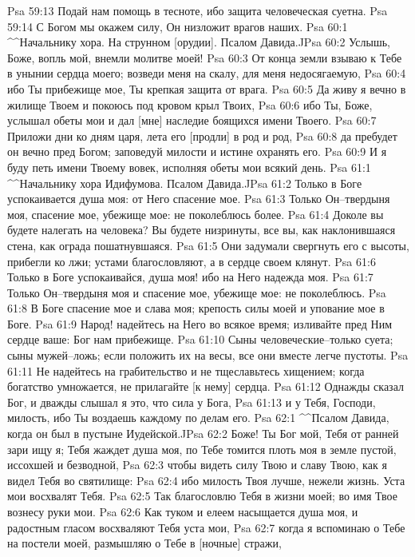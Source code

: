 Psa 59:13  Подай нам помощь в тесноте, ибо защита человеческая суетна.
Psa 59:14  С Богом мы окажем силу, Он низложит врагов наших.
Psa 60:1  ^^Начальнику хора. На струнном [орудии]. Псалом Давида.^^
Psa 60:2  Услышь, Боже, вопль мой, внемли молитве моей!
Psa 60:3  От конца земли взываю к Тебе в унынии сердца моего; возведи меня на скалу, для меня недосягаемую,
Psa 60:4  ибо Ты прибежище мое, Ты крепкая защита от врага.
Psa 60:5  Да живу я вечно в жилище Твоем и покоюсь под кровом крыл Твоих,
Psa 60:6  ибо Ты, Боже, услышал обеты мои и дал [мне] наследие боящихся имени Твоего.
Psa 60:7  Приложи дни ко дням царя, лета его [продли] в род и род,
Psa 60:8  да пребудет он вечно пред Богом; заповедуй милости и истине охранять его.
Psa 60:9  И я буду петь имени Твоему вовек, исполняя обеты мои всякий день.
Psa 61:1  ^^Начальнику хора Идифумова. Псалом Давида.^^
Psa 61:2  Только в Боге успокаивается душа моя: от Него спасение мое.
Psa 61:3  Только Он--твердыня моя, спасение мое, убежище мое: не поколеблюсь более.
Psa 61:4  Доколе вы будете налегать на человека? Вы будете низринуты, все вы, как наклонившаяся стена, как ограда пошатнувшаяся.
Psa 61:5  Они задумали свергнуть его с высоты, прибегли ко лжи; устами благословляют, а в сердце своем клянут.
Psa 61:6  Только в Боге успокаивайся, душа моя! ибо на Него надежда моя.
Psa 61:7  Только Он--твердыня моя и спасение мое, убежище мое: не поколеблюсь.
Psa 61:8  В Боге спасение мое и слава моя; крепость силы моей и упование мое в Боге.
Psa 61:9  Народ! надейтесь на Него во всякое время; изливайте пред Ним сердце ваше: Бог нам прибежище.
Psa 61:10  Сыны человеческие--только суета; сыны мужей--ложь; если положить их на весы, все они вместе легче пустоты.
Psa 61:11  Не надейтесь на грабительство и не тщеславьтесь хищением; когда богатство умножается, не прилагайте [к нему] сердца.
Psa 61:12  Однажды сказал Бог, и дважды слышал я это, что сила у Бога,
Psa 61:13  и у Тебя, Господи, милость, ибо Ты воздаешь каждому по делам его.
Psa 62:1  ^^Псалом Давида, когда он был в пустыне Иудейской.^^
Psa 62:2  Боже! Ты Бог мой, Тебя от ранней зари ищу я; Тебя жаждет душа моя, по Тебе томится плоть моя в земле пустой, иссохшей и безводной,
Psa 62:3  чтобы видеть силу Твою и славу Твою, как я видел Тебя во святилище:
Psa 62:4  ибо милость Твоя лучше, нежели жизнь. Уста мои восхвалят Тебя.
Psa 62:5  Так благословлю Тебя в жизни моей; во имя Твое вознесу руки мои.
Psa 62:6  Как туком и елеем насыщается душа моя, и радостным гласом восхваляют Тебя уста мои,
Psa 62:7  когда я вспоминаю о Тебе на постели моей, размышляю о Тебе в [ночные] стражи,
